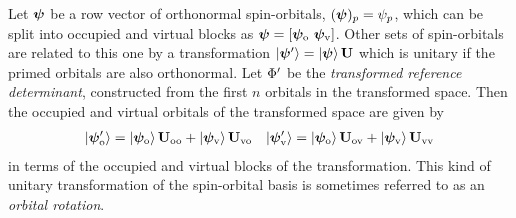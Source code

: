 \documentclass[11pt]{article}
\numberwithin{equation}{section}
\begin{document}
\begin{ntt}
\label{ntt:orbital-transformation}
Let $\bm{\y}$ be a row vector of orthonormal spin-orbitals, $(\bm{\y})_p=\y_p$, which can be split into occupied and virtual blocks as $\bm{\y}=[\bm{\y}_\mr{o}\ \bm{\y}_\mr{v}]$.
Other sets of spin-orbitals are related to this one by a transformation
$
  \kt{\bm{\y}'}
=
  \kt{\bm{\y}}\,
  \bo{U}
$
which is unitary if the primed orbitals are also orthonormal.
Let $\Phi '$ be the \textit{transformed reference determinant}, constructed from the first $n$ orbitals in the transformed space.
Then the occupied and virtual orbitals of the transformed space are given by
\begin{align}
\label{eq:block-transformation}
  \kt{\bm{\y}'_\mr{o}}
=
  \kt{\bm{\y}_\mr{o}}\,
  \bo{U}_\mr{oo}
+
  \kt{\bm{\y}_\mr{v}}\,
  \bo{U}_\mr{vo}
&&
  \kt{\bm{\y}'_\mr{v}}
=
  \kt{\bm{\y}_\mr{o}}\,
  \bo{U}_\mr{ov}
+
  \kt{\bm{\y}_\mr{v}}\,
  \bo{U}_\mr{vv}
\end{align}
in terms of the occupied and virtual blocks of the transformation.
This kind of unitary transformation of the spin-orbital basis is sometimes referred to as an \textit{orbital rotation}.


\end{ntt}
\end{document}
